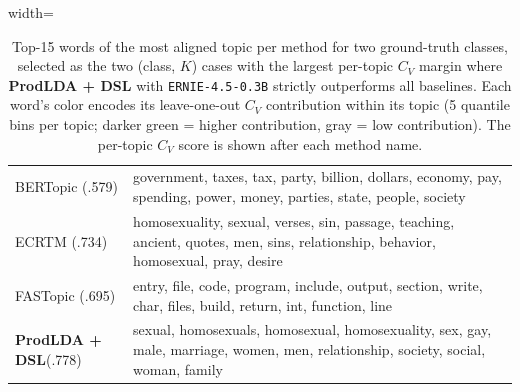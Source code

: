 \documentclass{article}
\theoremstyle{plain}
\theoremstyle{definition}
\theoremstyle{remark}
\begin{document}
\begin{table}[t]
\begin{adjustbox}{width=\linewidth}
\begin{tabular}{@{}l l@{}}
{\tiny BERTopic (.579)} & \textcolor{green!90!black}{government}, \textcolor{green!60!black}{taxes}, \textcolor{green!40!black}{tax}, \textcolor{black!40}{party}, \textcolor{black!70}{billion}, \textcolor{green!40!black}{dollars}, \textcolor{green!60!black}{economy}, \textcolor{green!40!black}{pay}, \textcolor{green!90!black}{spending}, \textcolor{black!70}{power}, \textcolor{green!60!black}{money}, \textcolor{black!40}{parties}, \textcolor{black!70}{state}, \textcolor{black!40}{people}, \textcolor{green!90!black}{society} \\
{\tiny ECRTM (.734)} & \textcolor{green!60!black}{homosexuality}, \textcolor{black!70}{sexual}, \textcolor{green!40!black}{verses}, \textcolor{green!90!black}{sin}, \textcolor{green!40!black}{passage}, \textcolor{black!40}{teaching}, \textcolor{black!70}{ancient}, \textcolor{black!40}{quotes}, \textcolor{green!60!black}{men}, \textcolor{green!90!black}{sins}, \textcolor{black!40}{relationship}, \textcolor{black!70}{behavior}, \textcolor{green!90!black}{homosexual}, \textcolor{green!60!black}{pray}, \textcolor{green!40!black}{desire} \\
{\tiny FASTopic (.695)} & \textcolor{green!60!black}{entry}, \textcolor{green!60!black}{file}, \textcolor{green!40!black}{code}, \textcolor{black!70}{program}, \textcolor{black!70}{include}, \textcolor{green!90!black}{output}, \textcolor{black!70}{section}, \textcolor{green!60!black}{write}, \textcolor{green!90!black}{char}, \textcolor{green!40!black}{files}, \textcolor{black!40}{build}, \textcolor{black!40}{return}, \textcolor{green!90!black}{int}, \textcolor{black!40}{function}, \textcolor{green!40!black}{line} \\
{\tiny \textbf{ProdLDA + DSL}(.778)} & \textcolor{green!90!black}{sexual}, \textcolor{green!60!black}{homosexuals}, \textcolor{green!60!black}{homosexual}, \textcolor{green!90!black}{homosexuality}, \textcolor{green!90!black}{sex}, \textcolor{green!60!black}{gay}, \textcolor{green!40!black}{male}, \textcolor{green!40!black}{marriage}, \textcolor{black!40}{women}, \textcolor{green!40!black}{men}, \textcolor{black!70}{relationship}, \textcolor{black!70}{society}, \textcolor{black!40}{social}, \textcolor{black!70}{woman}, \textcolor{black!40}{family} \\
\bottomrule
\end{tabular}
\end{adjustbox}

\caption{Top-15 words of the most aligned topic per method for two ground-truth classes, selected as the two (class, $K$) cases with the largest per-topic $C_V$ margin where \textbf{ProdLDA + DSL} with \texttt{ERNIE-4.5-0.3B} strictly outperforms all baselines. Each word's color encodes its leave-one-out $C_V$ contribution within its topic (5 quantile bins per topic; darker green = higher contribution, gray = low contribution). The per-topic $C_V$ score is shown after each method name.}
\vspace{-2em}
\label{tab:20newsgroup-topic-visualization}
\end{table}
\end{document}
